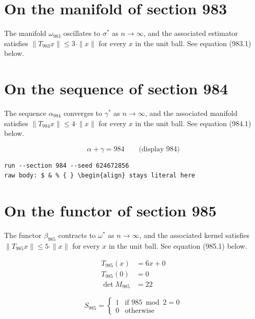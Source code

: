 \documentclass{article}
\begin{document}
\section{On the manifold of section 983}
The manifold $\omega_{983}$ oscillates to $\sigma^{*}$ as $n \to \infty$,
and the associated estimator satisfies $\|T_{983} x\| \leq 3 \cdot \|x\|$
for every $x$ in the unit ball. See equation (983.1) below.

\section{On the sequence of section 984}
The sequence $\alpha_{984}$ converges to $\gamma^{*}$ as $n \to \infty$,
and the associated manifold satisfies $\|T_{984} x\| \leq 4 \cdot \|x\|$
for every $x$ in the unit ball. See equation (984.1) below.

$$
\alpha + \gamma = 984 \qquad \text{(display 984)}
$$

\begin{verbatim}
run --section 984 --seed 624672856
raw body: $ & % { } \begin{align} stays literal here
\end{verbatim}

\section{On the functor of section 985}
The functor $\beta_{985}$ contracts to $\omega^{*}$ as $n \to \infty$,
and the associated kernel satisfies $\|T_{985} x\| \leq 5 \cdot \|x\|$
for every $x$ in the unit ball. See equation (985.1) below.

\begin{align}
T_{985}(x) &= 6 x + 0 \\
T_{985}(0) &= 0 \\
\det M_{985} &= 22
\end{align}

\begin{equation}
S_{985} = \begin{cases} 1 & \text{if } 985 \bmod 2 = 0 \\ 0 & \text{otherwise} \end{cases}
\end{equation}
\end{document}
